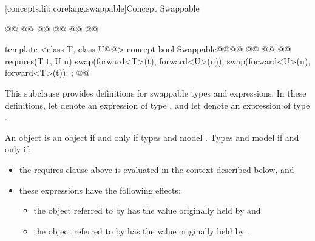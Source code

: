 \begin{addedblock}
[concepts.lib.corelang.swappable]{Concept Swappable}

%
\begin{itemdecl}
@@
@@
  @@
    @@
  @\newtxt{\};}@
@\newtxt{\}}@

template <class T, class U@@>
concept bool Swappable@\newtxt{() \{}@@\oldtxt{ =}@
  @@
    @@
    @@
    requires(T t, U u) {
      swap(forward<T>(t), forward<U>(u));
      swap(forward<U>(u), forward<T>(t));
    };
@\newtxt{\}}@
\end{itemdecl}

\begin{itemdescr}

\pnum
This subclause provides definitions for swappable types and expressions. In these
definitions, let  denote an expression of type , and let 
denote an expression of type .

\pnum
An object  is  an object  if and only if
types  and  model . Types  and 
model  if and only if:

\begin{itemize}
\item the requires clause above is evaluated in the context described below, and

\item these expressions have the following effects:

\begin{itemize}
\item the object referred to by  has the value originally held by  and
\item the object referred to by  has the value originally held by .
\end{itemize}
\end{itemize}


\end{itemdescr}
\end{addedblock}
